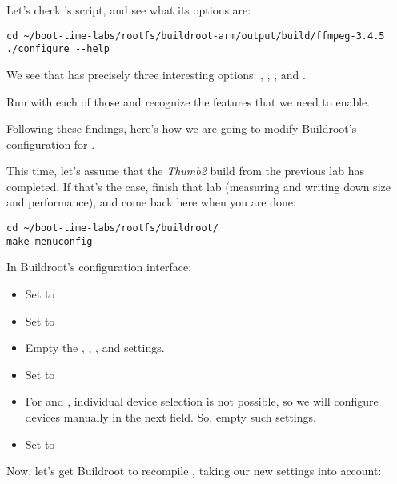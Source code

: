 Let's check 's  script, and see what its
options are:

\begin{verbatim}
cd ~/boot-time-labs/rootfs/buildroot-arm/output/build/ffmpeg-3.4.5
./configure --help
\end{verbatim}

We see that  has precisely three interesting options:
, , ,
 and .

Run  with each of those and recognize the features that
we need to enable.

Following these findings, here's how we are going to modify Buildroot's
configuration for .

This time, let's assume that the {\em Thumb2} build from the previous
lab has completed. If that's the case, finish that lab (measuring and
writing down size and performance), and come back here when you are done:

\begin{verbatim}
cd ~/boot-time-labs/rootfs/buildroot/
make menuconfig
\end{verbatim}

In Buildroot's configuration interface:

\begin{itemize}
\item Set  to 
\item Set  to 
\item Empty the , ,
      ,  and  settings.
\item Set  to 
\item For  and ,
      individual device selection is not possible, so we will configure
      devices manually in the next field. So, empty such settings.
\item Set  to\\
\end{itemize}

Now, let's get Buildroot to recompile , taking our new
settings into account:

